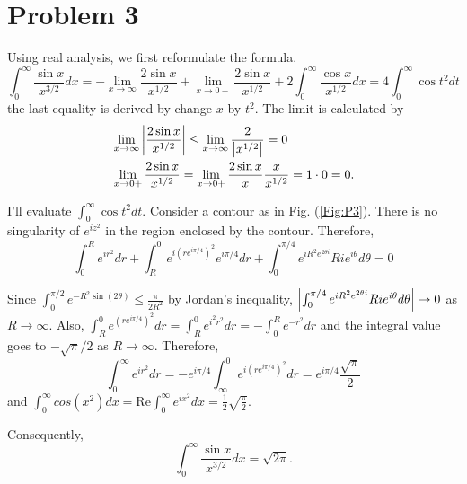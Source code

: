 \documentclass{article}
\begin{document}
\section*{Problem 3}
Using real analysis, we first reformulate the formula.
\begin{equation*}
\int_0^\infty \frac{\sin{x}}{x^{3/2}}dx=-\lim\limits_{x\rightarrow \infty} \frac{2\sin{x}}{x^{1/2}} + \lim\limits_{x\rightarrow 0+} \frac{2\sin{x}}{x^{1/2}} + 2\int_0^\infty \frac{\cos{x}}{x^{1/2}}dx=4\int_0^\infty \cos{t^2} dt
\end{equation*}
the last equality is derived by change $x$ by $t^2$. The limit is calculated by
\begin{equation*}
\begin{split}
&\lim\limits_{x\rightarrow \infty} \abs{\frac{2\sin{x}}{x^{1/2}}}\leq \lim\limits_{x\rightarrow \infty} \frac{2}{\abs{x^{1/2}}} = 0 \\
&\lim\limits_{x\rightarrow 0+} \frac{2\sin{x}}{x^{1/2}}=\lim\limits_{x\rightarrow 0+} \frac{2\sin{x}}{x}\frac{x}{x^{1/2}} = 1\cdot 0=0.
\end{split}
\end{equation*}

I'll evaluate $\int_0^\infty \cos{t^2} dt$. Consider a contour as in Fig. (\ref{Fig:P3}). There is no singularity of $e^{iz^2}$ in the region enclosed by the contour. Therefore,
\begin{equation*}
\int_0^R e^{ir^2} dr+ \int_R^0 e^{i(re^{i\pi/4})^2} e^{i\pi/4} dr + \int_0^{\pi/4} e^{iR^2e^{2\theta i}}Rie^{i\theta}d\theta = 0
\end{equation*}

Since $\int_0^{\pi/2}e^{{-R^2\sin(2\theta)}}\leq \frac{\pi}{2R^2}$ by Jordan's inequality, $\abs{\int_0^{\pi/4} e^{iR^2e^{2\theta i}}Rie^{i\theta}d\theta}\rightarrow 0$ as $R\rightarrow \infty$.
Also, $\int_R^0 e^{(re^{i\pi/4})^2} dr=\int_R^0 e^{i^2r^2} dr=-\int_0^R e^{-r^2} dr$ and the integral value goes to $-\sqrt{\pi}/2$ as $R\rightarrow \infty$. Therefore,
\begin{equation*}
\int_0^\infty e^{ir^2} dr=-e^{i\pi/4}\int_\infty^0 e^{i(re^{i\pi/4})^2} dr=e^{i\pi/4}\frac{\sqrt{\pi}}{2}
\end{equation*}
and $\int_0^\infty cos(x^2) dx = \text{Re}\int_0^\infty e^{ix^2} dx=\frac{1}{2}\sqrt{\frac{\pi}{2}}$.

Consequently,
\begin{equation*}
\int_0^\infty \frac{\sin{x}}{x^{3/2}}dx=\sqrt{2\pi}.
\end{equation*}
\end{document}
